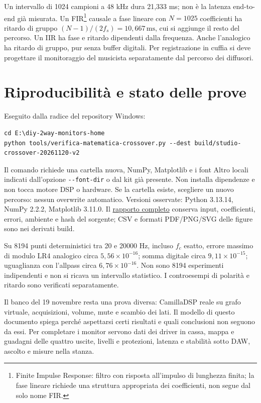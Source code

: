 \documentclass[
  italian,
  11pt,
  a4paper,
]{article}
\begin{document}
Un intervallo di 1024 campioni a 48 kHz dura 21,333 ms; non è la latenza end-to-end già
misurata. Un FIR\footnote{Finite Impulse Response: filtro con risposta all'impulso di
  lunghezza finita; la fase lineare richiede una struttura appropriata dei coefficienti, non
  segue dal solo nome FIR.} causale a fase lineare con \(N=1025\) coefficienti ha ritardo di
gruppo \((N-1)/(2f_s)=10{,}667\,\mathrm{ms}\), cui si aggiunge il resto del percorso. Un IIR
ha fase e ritardo dipendenti dalla frequenza. Anche l'analogico ha ritardo di gruppo, pur
senza buffer digitali. Per registrazione in cuffia si deve progettare il monitoraggio del
musicista separatamente dal percorso dei diffusori.

\section{Riproducibilità e stato delle prove}\label{riproducibilituxe0-e-stato-delle-prove}

Eseguito dalla radice del repository Windows:

\begin{lstlisting}
cd E:\diy-2way-monitors-home
python tools/verifica-matematica-crossover.py --dest build/studio-crossover-20261120-v2
\end{lstlisting}

Il comando richiede una cartella nuova, NumPy, Matplotlib e i font Altro locali indicati
dall'opzione \mbox{\texttt{-\/-font-dir}} o dal kit già presente. Non installa dipendenze e
non tocca motore DSP o hardware. Se la cartella esiste, scegliere un nuovo percorso: nessun
overwrite automatico. Versioni osservate: Python 3.13.14, NumPy 2.2.2, Matplotlib 3.11.0. Il
\href{../../research-vault/crossover-pc-pi-analogico/risultati-modello.json}{rapporto
completo} conserva input, coefficienti, errori, ambiente e hash del sorgente; CSV e formati
PDF/PNG/SVG delle figure sono nei derivati build.

Su 8194 punti deterministici tra 20 e 20000 Hz, incluso \(f_c\) esatto, errore massimo di
modulo LR4 analogico circa \(5{,}56\times10^{-16}\); somma digitale circa
\(9{,}11\times10^{-15}\); uguaglianza con l'allpass circa \(6{,}76\times10^{-16}\). Non sono
8194 esperimenti indipendenti e non si ricava un intervallo statistico. I controesempi di
polarità e ritardo sono verificati separatamente.

Il banco del 19 novembre resta una prova diversa: CamillaDSP reale su grafo virtuale,
acquisizioni, volume, mute e scambio dei lati. Il modello di questo documento spiega perché
aspettarsi certi risultati e quali conclusioni non seguono da essi. Per completare i monitor
servono dati dei driver in cassa, mappa e guadagni delle quattro uscite, livelli e
protezioni, latenza e stabilità sotto DAW, ascolto e misure nella stanza.
\end{document}
